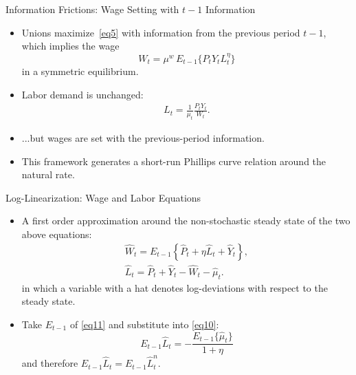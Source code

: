 \documentclass[11pt,aspectratio=169]{beamer}
\begin{document}
\begin{frame}{Information Frictions: Wage Setting with $t\!-\!1$ Information}
\begin{itemize}
    \item Unions maximize~\eqref{eq5} with information from the previous period $t-1$, which implies the wage $$W_t=\mu^w\,E_{t-1}\{P_t Y_t L_t^\eta\}$$ in a symmetric equilibrium. 
    \item Labor demand is unchanged: 
    \begin{align}
        L_{t}=\frac{1}{\mu _{t}}\frac{P_{t}Y_{t}}{W_{t}}. 
        \label{eq9}
    \end{align}
    \item ...but wages are set with the previous-period information.
    \item This framework generates a short-run Phillips curve relation around the natural rate.
\end{itemize}
\end{frame}

\begin{frame}{Log-Linearization: Wage and Labor Equations}
\begin{itemize}
    \item A first order approximation around the non-stochastic steady state of the two above equations: 
    \begin{align}
        \hat{W}_{t}=E_{t-1}\left\{ \hat{P}_{t}+\eta \hat{L}_{t}+\hat{Y}_{t}\right\}, \label{eq10}\\
        \hat{L}_{t}=\hat{P}_{t}+\hat{Y}_{t}-\hat{W}_{t}-\hat{\mu}_{t}. \label{eq11}
    \end{align}
    in which a variable with a hat denotes log-deviations with respect to the steady state. 
    \item Take $E_{t-1}$ of \eqref{eq11} and substitute into \eqref{eq10}: $$E_{t-1}\hat{L}_{t}=-\frac{E_{t-1}\{\hat{\mu}_t\}}{1+\eta}$$ and therefore $E_{t-1}\hat{L}_{t}=E_{t-1}\hat{L}_t^n$.
\end{itemize}
\end{frame}
\end{document}
